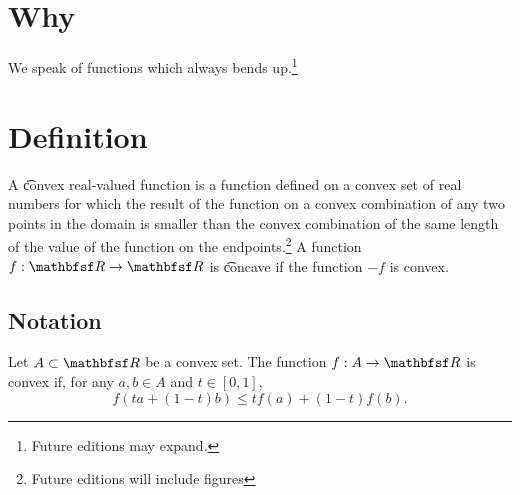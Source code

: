 

\section*{Why}

We speak of functions which always bends up.\footnote{Future editions may expand.}

\section*{Definition}

A \t{convex} real-valued function is a function defined on a convex set of real numbers for which the result of the function on a convex combination of any two points in the domain is smaller than the convex combination of the same length of the value of the function on the endpoints.\footnote{Future editions will include figures}
A function $f: \R  \to \R $ is \t{concave} if the function $-f$ is convex.

\subsection*{Notation}

Let $A \subset \R $ be a convex set.
The function $f: A \to \R $ is convex if, for any $a, b \in A$ and $t \in [0, 1]$,
    \[
f(ta + (1-t)b) \leq tf(a) + (1-t)f(b).
    \]

\blankpage